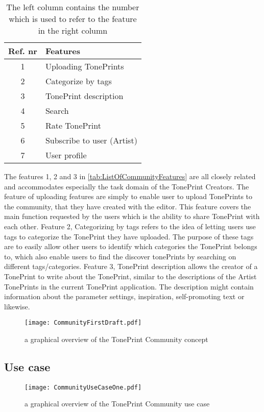 \begin{table}[H]
	\centering
\begin{tabular}[width=\textwidth]{c|l}
\textbf{Ref. nr} & \textbf{Features} \\ \hline
1 & Uploading TonePrints \\ \hline
2 & Categorize by tags \\ \hline
3 & TonePrint description \\ \hline
4 & Search \\ \hline
5 & Rate TonePrint \\ \hline
6 & Subscribe to user (Artist) \\ \hline
7 & User profile \\ \hline
\end{tabular}
\caption{The left column contains the number which is used to refer to the feature in the right column}
\label{tab:ListOfCommunityFeatures}
\end{table}

The features 1, 2 and 3 in \autoref{tab:ListOfCommunityFeatures} are all closely related and accommodates especially the task domain of the TonePrint Creators. The feature of uploading features are simply to enable user to upload TonePrints to the community, that they have created with the editor. This feature covers the main function requested by the users which is the ability to share TonePrint with each other. Feature 2, Categorizing by tags refers to the idea of letting users use tags to categorize the TonePrint they have uploaded. The purpose of these tags are to easily allow other users to identify which categories the TonePrint belongs to, which also enable users to find the discover tonePrints by searching on different tags/categories. Feature 3, TonePrint description allows the creator of a TonePrint to write about the TonePrint, similar to the descriptions of the Artist TonePrints in the current TonePrint application. The description might contain information about the parameter settings, inspiration, self-promoting text or likewise.

\begin{figure}[H]
	\centering
	\texttt{[image: CommunityFirstDraft.pdf]}
	\caption{a graphical overview of the TonePrint Community concept}
	\label{fig:CommunityConceptualModel}
\end{figure}

\subsection{Use case}

\begin{figure}
	\centering
	\texttt{[image: CommunityUseCaseOne.pdf]}
	\caption{a graphical overview of the TonePrint Community use case}
	\label{fig:CommunityConceptualUseCase}
\end{figure}